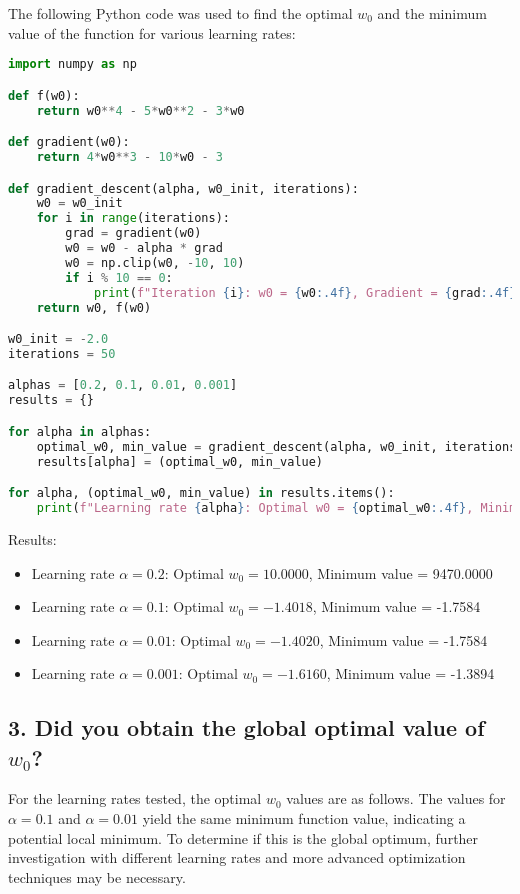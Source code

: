 \documentclass[a4paper,10pt]{article}
\begin{document}
The following Python code was used to find the optimal $w_0$ and the minimum value of the function for various learning rates:

\begin{lstlisting}[language=Python, caption=Python Code for Optimal Parameters]
import numpy as np

def f(w0):
    return w0**4 - 5*w0**2 - 3*w0

def gradient(w0):
    return 4*w0**3 - 10*w0 - 3

def gradient_descent(alpha, w0_init, iterations):
    w0 = w0_init
    for i in range(iterations):
        grad = gradient(w0)
        w0 = w0 - alpha * grad
        w0 = np.clip(w0, -10, 10)
        if i % 10 == 0:
            print(f"Iteration {i}: w0 = {w0:.4f}, Gradient = {grad:.4f}")
    return w0, f(w0)

w0_init = -2.0
iterations = 50

alphas = [0.2, 0.1, 0.01, 0.001]
results = {}

for alpha in alphas:
    optimal_w0, min_value = gradient_descent(alpha, w0_init, iterations)
    results[alpha] = (optimal_w0, min_value)

for alpha, (optimal_w0, min_value) in results.items():
    print(f"Learning rate {alpha}: Optimal w0 = {optimal_w0:.4f}, Minimum value = {min_value:.4f}")
\end{lstlisting}
Results:

\begin{itemize}
    \item Learning rate $\alpha = 0.2$: Optimal $w_0 = 10.0000$, Minimum value = 9470.0000
    \item Learning rate $\alpha = 0.1$: Optimal $w_0 = -1.4018$, Minimum value = -1.7584
    \item Learning rate $\alpha = 0.01$: Optimal $w_0 = -1.4020$, Minimum value = -1.7584
    \item Learning rate $\alpha = 0.001$: Optimal $w_0 = -1.6160$, Minimum value = -1.3894
\end{itemize}

\subsection*{3. Did you obtain the global optimal value of $w_0$?}

For the learning rates tested, the optimal $w_0$ values are as follows. The values for $\alpha = 0.1$ and $\alpha = 0.01$ yield the same minimum function value, indicating a potential local minimum. To determine if this is the global optimum, further investigation with different learning rates and more advanced optimization techniques may be necessary.
\end{document}

